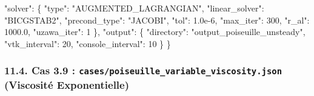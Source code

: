 \documentclass[
  french,
]{article}
\newenvironment{Shaded}{}{}
\newcommand{\DataTypeTok}[1]{\textcolor[rgb]{0.56,0.13,0.00}{#1}}
\newcommand{\DecValTok}[1]{\textcolor[rgb]{0.25,0.63,0.44}{#1}}
\newcommand{\FloatTok}[1]{\textcolor[rgb]{0.25,0.63,0.44}{#1}}
\newcommand{\FunctionTok}[1]{\textcolor[rgb]{0.02,0.16,0.49}{#1}}
\newcommand{\StringTok}[1]{\textcolor[rgb]{0.25,0.44,0.63}{#1}}
\begin{document}
\begin{Shaded}
\begin{Highlighting}[]
  \DataTypeTok{"solver"}\FunctionTok{:} \FunctionTok{\{}
    \DataTypeTok{"type"}\FunctionTok{:} \StringTok{"AUGMENTED\_LAGRANGIAN"}\FunctionTok{,}
    \DataTypeTok{"linear\_solver"}\FunctionTok{:} \StringTok{"BICGSTAB2"}\FunctionTok{,}
    \DataTypeTok{"precond\_type"}\FunctionTok{:} \StringTok{"JACOBI"}\FunctionTok{,}
    \DataTypeTok{"tol"}\FunctionTok{:} \FloatTok{1.0e{-}6}\FunctionTok{,} \DataTypeTok{"max\_iter"}\FunctionTok{:} \DecValTok{300}\FunctionTok{,} \DataTypeTok{"r\_al"}\FunctionTok{:} \FloatTok{1000.0}\FunctionTok{,} \DataTypeTok{"uzawa\_iter"}\FunctionTok{:} \DecValTok{1}
  \FunctionTok{\},}
  \DataTypeTok{"output"}\FunctionTok{:} \FunctionTok{\{} \DataTypeTok{"directory"}\FunctionTok{:} \StringTok{"output\_poiseuille\_unsteady"}\FunctionTok{,} \DataTypeTok{"vtk\_interval"}\FunctionTok{:} \DecValTok{20}\FunctionTok{,} \DataTypeTok{"console\_interval"}\FunctionTok{:} \DecValTok{10} \FunctionTok{\}}
\FunctionTok{\}}
\end{Highlighting}
\end{Shaded}

\subsubsection{\texorpdfstring{11.4. Cas 3.9 :
\texttt{cases/poiseuille\_variable\_viscosity.json} (Viscosité
Exponentielle)}{11.4. Cas 3.9 : cases/poiseuille\_variable\_viscosity.json (Viscosité Exponentielle)}}\label{cas-3.9-casespoiseuille_variable_viscosity.json-viscosituxe9-exponentielle}
\end{document}
